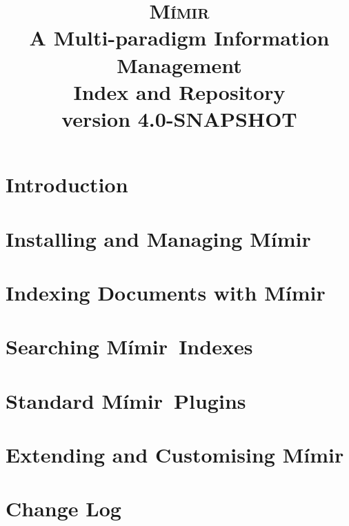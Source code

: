 \documentclass[10pt, a4paper, twoside]{report}
\newcommand{\Mimir}{M\'{i}mir}
\begin{document}
\title{{\Huge {\textsc{\Mimir}}}\\
A Multi-paradigm Information Management\\
Index and Repository\\
{\small version 4.0-SNAPSHOT}
}

\thispagestyle{empty}
\maketitle


\clearpage

\setcounter{tocdepth}{2}
\tableofcontents

\thispagestyle{empty}
\cleardoublepage

\pagestyle{fancy}
\fancyhead{} %
\fancyhead[RO,LE]{\Mimir}

\chapter{Introduction}\label{sec:intro}

%

\chapter{Installing and Managing \Mimir}\label{sec:admin}

\chapter{Indexing Documents with \Mimir}\label{sec:indexing}

\chapter{Searching \Mimir\ Indexes}\label{sec:searching}

\chapter{Standard \Mimir\ Plugins}\label{sec:plugins}

\chapter{Extending and Customising \Mimir}\label{sec:extend}


\appendix
\chapter{Change Log}\label{sec:changes}

\end{document}
